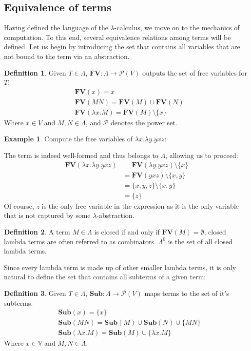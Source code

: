 \documentclass[12pt]{book}
\newcommand{\la}{\lambda}
\newcommand{\La}{\Lambda}
\newcommand{\Vset}{V}
\newcommand{\lcalc}{$\la$-calculus}
\newcommand{\functionfont}[1]{\mathbf{#1}}
\newcommand{\Sub}[1]{\functionfont{Sub}(#1)}
\newcommand{\FV}[1]{\functionfont{FV}(#1)}
\theoremstyle{plain}
\theoremstyle{definition}
\newtheorem{definition}{Definition}[section]
\theoremstyle{definition}
\newtheorem{example}{Example}[section]
\theoremstyle{definition}
\begin{document}
\subsection{\centering Equivalence of terms}
Having defined the language of the \lcalc, we move on to the mechanics of computation. To this end, several equivalence relations among terms will be defined. Let us begin by introducing the set that contains all variables that are not bound to the term via an abstraction.
\begin{definition} Given $T \in \La $, $\functionfont{FV} : \La \to \mathcal{P}(\Vset) $ outputs the set of free variables for $T$:
  \begin{align*}
    & \FV x = {x}\\
    & \FV {MN} = \FV M \cup \FV N \\
    & \FV {\lambda x . M} = \FV M \setminus \{x\}
  \end{align*}
  Where $ x \in \Vset $ and $ M, N \in \La $, and $\mathcal{P}$ denotes the power set.
\end{definition}
\begin{example}
  Compute the free variables of $\lambda x . \lambda y . y x z$:
  
  The term is indeed well-formed and thus belongs to $\La$, allowing us to proceed:
  \begin{align*}
    \FV {\lambda x . \lambda y . y x z} &= \FV {\lambda y . yxz} \setminus \{x\} \\
                                        &= \FV {yxz} \setminus \{x, y\} \\
                                        &= \{x, y, z\} \setminus \{x, y\} \\
                                        &= \{z\}
  \end{align*}
  Of course, $z$ is the only free variable in the expression as it is the only variable that is not captured by some $\la$-abstraction.
\end{example}
\begin{definition}
  A term $M \in \Lambda$ is closed if and only if $\FV M = \emptyset$, closed lambda terms are often referred to as combinators. $\Lambda^0$ is the set of all closed lambda terms.
\end{definition}
Since every lambda term is made up of other smaller lambda terms, it is only natural to define the set that contains all subterms of a given term:
\begin{definition} Given $T \in \La$, $\functionfont{Sub} : \La \to \mathcal{P}(\Vset)$ maps terms to the set of it's subterms.
\begin{align*}
  &\Sub x = \{x\} \\
  &\Sub {MN} = \Sub M  \cup \Sub N \cup \{MN\} \\
  &\Sub {\lambda x . M} = \Sub M  \cup \{\lambda x. M\}
\end{align*}
Where $x \in \mathbb{V}$ and $M, N \in \Lambda $.
\end{definition}
\end{document}
